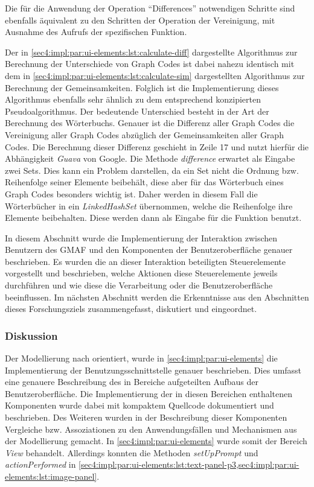 

Die für die Anwendung der Operation \enquote{Differences} notwendigen Schritte sind ebenfalls äquivalent zu den Schritten der Operation der Vereinigung, mit Ausnahme des Aufrufs der spezifischen Funktion.

Der in \cref{sec4:impl:par:ui-elements:lst:calculate-diff} dargestellte Algorithmus zur Berechnung der Unterschiede von Graph Codes ist dabei nahezu identisch mit dem in \cref{sec4:impl:par:ui-elements:lst:calculate-sim} dargestellten Algorithmus zur Berechnung der Gemeinsamkeiten.
Folglich ist die Implementierung dieses Algorithmus ebenfalls sehr ähnlich zu dem entsprechend konzipierten Pseudoalgorithmus.
Der bedeutende Unterschied besteht in der Art der Berechnung des Wörterbuchs.
Genauer ist die Differenz aller Graph Codes die Vereinigung aller Graph Codes abzüglich der Gemeinsamkeiten aller Graph Codes.
Die Berechnung dieser Differenz geschieht in Zeile 17 und nutzt hierfür die Abhängigkeit \textit{Guava} von Google.
Die Methode \textit{difference} erwartet als Eingabe zwei Sets.
Dies kann ein Problem darstellen, da ein Set nicht die Ordnung bzw. Reihenfolge seiner Elemente beibehält, diese aber für das Wörterbuch eines Graph Codes besonders wichtig ist.
Daher werden in diesem Fall die Wörterbücher in ein \textit{LinkedHashSet} übernommen, welche die Reihenfolge ihre Elemente beibehalten.
Diese werden dann als Eingabe für die Funktion benutzt.

In diesem Abschnitt wurde die Implementierung der Interaktion zwischen Benutzern des GMAF und den Komponenten der Benutzeroberfläche genauer beschrieben.
Es wurden die an dieser Interaktion beteiligten Steuerelemente vorgestellt und beschrieben, welche Aktionen diese Steuerelemente jeweils durchführen und wie diese die Verarbeitung oder die Benutzeroberfläche beeinflussen.
Im nächsten Abschnitt werden die Erkenntnisse aus den Abschnitten dieses Forschungsziels zusammengefasst, diskutiert und eingeordnet.

\clearpage

\subsubsection{Diskussion}
\label{sec4:impl:subsubsec:fz1:discussion}
Der Modellierung nach orientiert, wurde in \cref{sec4:impl:par:ui-elements} die Implementierung der Benutzungsschnittstelle genauer beschrieben.
Dies umfasst eine genauere Beschreibung des in Bereiche aufgeteilten Aufbaus der Benutzeroberfläche.
Die Implementierung der in diesen Bereichen enthaltenen Komponenten wurde dabei mit kompaktem Quellcode dokumentiert und beschrieben.
Des Weiteren wurden in der Beschreibung dieser Komponenten Vergleiche bzw. Assoziationen zu den Anwendungsfällen und Mechanismen aus der Modellierung gemacht.
In \cref{sec4:impl:par:ui-elements} wurde somit der Bereich \textit{View} behandelt.
Allerdings konnten die Methoden \textit{setUpPrompt} und \textit{actionPerformed} in \cref{sec4:impl:par:ui-elements:lst:text-panel-p3,sec4:impl:par:ui-elements:lst:image-panel}.

